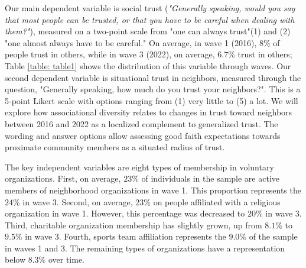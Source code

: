 Our main dependent variable is social trust (\textit{"Generally speaking, would you say that most people can be trusted, or that you have to be careful when dealing with them?"}), measured on a two-point scale from "one can always trust"(1) and (2) "one almost always have to be careful." On average, in wave 1 (2016), $8\%$ of people trust in others, while in wave 3 (2022), on average, $6.7\%$ trust in others; Table \ref{table: table1} shows the distribution of this variable through waves. Our second dependent variable is situational trust in neighbors, measured through the question, "Generally speaking, how much do you trust your neighbors?". This is a 5-point Likert scale with options ranging from (1) very little to (5) a lot. We will explore how associational diversity relates to changes in trust toward neighbors between 2016 and 2022 as a localized complement to generalized trust. The wording and answer options allow assessing good faith expectations towards proximate community members as a situated radius of trust.
\bigskip

The key independent variables are eight types of membership in voluntary organizations. First, on average, $23\%$ of individuals in the sample are active members of neighborhood organizations in wave 1. This proportion represents the $24\%$ in wave 3. Second, on average, $23\%$ on people affiliated with a religious organization in wave 1. However, this percentage was decreased to $20\%$ in wave 3. Third, charitable organization membership has slightly grown, up from $8.1\%$ to $9.5\%$ in wave 3. Fourth, sports team affiliation represents the $9.0\%$ of the sample in waves 1 and 3. The remaining types of organizations have a representation below $8.3\%$ over time.

